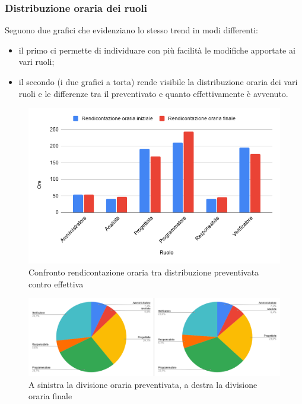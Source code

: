         \subsubsection{Distribuzione oraria dei ruoli}
            Seguono due grafici che evidenziano lo stesso trend in modi differenti: 
            \begin{itemize}
                \item il primo ci permette di individuare con più facilità le modifiche apportate ai vari ruoli;
                \item il secondo (i due grafici a torta) rende visibile la distribuzione oraria dei vari ruoli e le differenze tra il preventivato e quanto effettivamente è avvenuto.
            \end{itemize}
            \begin{figure}[H]
                \centering
                \includegraphics[width=\textwidth]{source/img/confronto_rendicontazione.png}
                \caption{Confronto rendicontazione oraria tra distribuzione preventivata contro effettiva}
            \end{figure}
            \begin{figure}[H]
                \centering
                \includegraphics[width=\textwidth]{source/img/confronto_divisione_oraria.png}
                \caption{A sinistra la divisione oraria preventivata, a destra la divisione oraria finale}
            \end{figure}
